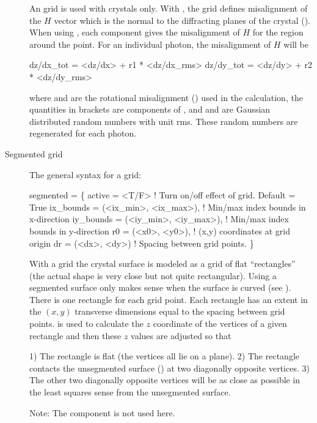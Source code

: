 \begin{description}
An  grid is used with crystals only. With , the grid defines
misalignment of the $H$ vector which is the normal to the diffracting planes of the crystal
().  When using , each  component gives the
misalignment of $H$ for the region around the point. For an individual photon, the misalignment of $H$
will be
\begin{example}
  dz/dx_tot = <dz/dx> + r1 * <dz/dx_rms>
  dz/dy_tot = <dz/dy> + r2 * <dz/dy_rms>
\end{example}
where  and  are the rotational misalignment () used
in the calculation, the quantities in brackets  are components of , and  and
 are Gaussian distributed random numbers with unit rms. These random numbers are regenerated
for each photon.
%
\item[Segmented grid] \Newline
The general syntax for a  grid:
\begin{example}
  segmented = \{
      active = <T/F>                     ! Turn on/off effect of grid. Default = True
      ix_bounds = (<ix_min>, <ix_max>),  ! Min/max index bounds in x-direction
      iy_bounds = (<iy_min>, <iy_max>),  ! Min/max index bounds in y-direction
      r0 = (<x0>, <y0>),                 ! (x,y) coordinates at grid origin
      dr = (<dx>, <dy>)                  ! Spacing between grid points.
          \}
\end{example}

With a  grid the crystal surface is modeled as a grid of flat ``rectangles'' (the
actual shape is very close but not quite rectangular). Using a segmented surface only makes sense
when the surface is curved (see ). There is one rectangle for each grid point. Each rectangle
has an extent in the $(x,y)$ transverse dimensions equal to the spacing between grid points.
 is used to calculate the $z$ coordinate of the vertices of a given rectangle and
then these $z$ values are adjusted so that
\begin{example}
  1) The rectangle is flat (the vertices all lie on a plane).
  2) The rectangle contacts the unsegmented surface () at two diagonally 
       opposite vertices.
  3) The other two diagonally opposite vertices will be as close as possible in the 
       least squares sense from the unsegmented surface.
\end{example}
Note: The  component is not used here.
\end{description}

